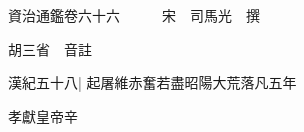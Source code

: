






























































資治通鑑卷六十六　　　宋　司馬光　撰

胡三省　音註

漢紀五十八|{
	起屠維赤奮若盡昭陽大荒落凡五年}


孝獻皇帝辛

